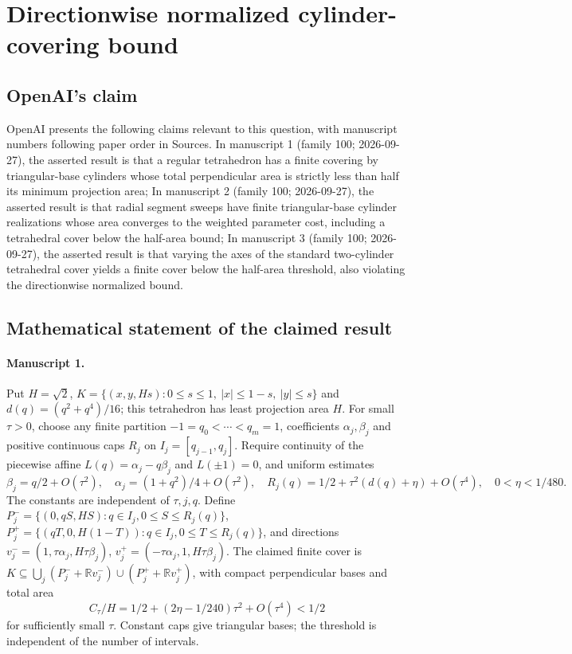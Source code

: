 \documentclass[11pt]{article}
\begin{document}
\section*{Directionwise normalized cylinder-covering bound}

\subsection{OpenAI's claim}
OpenAI presents the following claims relevant to this question, with manuscript numbers following paper order in Sources. In manuscript 1 (family 100; 2026-09-27), the asserted result is that a regular tetrahedron has a finite covering by triangular-base cylinders whose total perpendicular area is strictly less than half its minimum projection area; In manuscript 2 (family 100; 2026-09-27), the asserted result is that radial segment sweeps have finite triangular-base cylinder realizations whose area converges to the weighted parameter cost, including a tetrahedral cover below the half-area bound; In manuscript 3 (family 100; 2026-09-27), the asserted result is that varying the axes of the standard two-cylinder tetrahedral cover yields a finite cover below the half-area threshold, also violating the directionwise normalized bound.

\subsection{Mathematical statement of the claimed result}
\paragraph{Manuscript 1.}
Put $H=\sqrt2$, $K=\{(x,y,Hs):0\le s\le1,\ |x|\le1-s,\ |y|\le s\}$ and $d(q)=(q^2+q^4)/16$; this tetrahedron has least projection area $H$. For small $\tau>0$, choose any finite partition $-1=q_0<\cdots<q_m=1$, coefficients $\alpha_j,\beta_j$ and positive continuous caps $R_j$ on $I_j=[q_{j-1},q_j]$. Require continuity of the piecewise affine $L(q)=\alpha_j-q\beta_j$ and $L(\pm1)=0$, and uniform estimates
\[
 \beta_j=q/2+O(\tau^2),\quad\alpha_j=(1+q^2)/4+O(\tau^2),\quad
 R_j(q)=1/2+\tau^2(d(q)+\eta)+O(\tau^4),\quad0<\eta<1/480.
\]
The constants are independent of $\tau,j,q$. Define $P_j^-=\{(0,qS,HS):q\in I_j,0\le S\le R_j(q)\}$, $P_j^+=\{(qT,0,H(1-T)):q\in I_j,0\le T\le R_j(q)\}$, and directions $v_j^-=(1,\tau\alpha_j,H\tau\beta_j)$, $v_j^+=(-\tau\alpha_j,1,H\tau\beta_j)$. The claimed finite cover is $K\subseteq\bigcup_j(P_j^-+\mathbb Rv_j^-)\cup(P_j^++\mathbb Rv_j^+)$, with compact perpendicular bases and total area
\[
 C_{\tau}/H=1/2+(2\eta-1/240)\tau^2+O(\tau^4)<1/2
\]
for sufficiently small $\tau$. Constant caps give triangular bases; the threshold is independent of the number of intervals.
\end{document}
